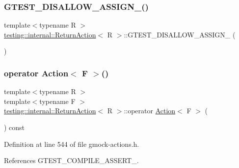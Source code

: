 \subsubsection{\texorpdfstring{G\+T\+E\+S\+T\+\_\+\+D\+I\+S\+A\+L\+L\+O\+W\+\_\+\+A\+S\+S\+I\+G\+N\+\_\+()}{GTEST\_DISALLOW\_ASSIGN\_()}}
{\footnotesize\ttfamily template$<$typename R $>$ \\
\hyperlink{classtesting_1_1internal_1_1ReturnAction}{testing\+::internal\+::\+Return\+Action}$<$ R $>$\+::G\+T\+E\+S\+T\+\_\+\+D\+I\+S\+A\+L\+L\+O\+W\+\_\+\+A\+S\+S\+I\+G\+N\+\_\+ (\begin{DoxyParamCaption}\item[{\hyperlink{classtesting_1_1internal_1_1ReturnAction}{Return\+Action}$<$ R $>$}]{ }\end{DoxyParamCaption})\hspace{0.3cm}{\ttfamily [private]}}

\mbox{\label{classtesting_1_1internal_1_1ReturnAction_a1aab69c4ea104e76e70ba209763f61d5}} 
\subsubsection{\texorpdfstring{operator Action$<$ F $>$()}{operator Action< F >()}}
{\footnotesize\ttfamily template$<$typename R $>$ \\
template$<$typename F $>$ \\
\hyperlink{classtesting_1_1internal_1_1ReturnAction}{testing\+::internal\+::\+Return\+Action}$<$ R $>$\+::operator \hyperlink{classtesting_1_1Action}{Action}$<$ F $>$ (\begin{DoxyParamCaption}{ }\end{DoxyParamCaption}) const\hspace{0.3cm}{\ttfamily [inline]}}



Definition at line 544 of file gmock-\/actions.\+h.



References G\+T\+E\+S\+T\+\_\+\+C\+O\+M\+P\+I\+L\+E\+\_\+\+A\+S\+S\+E\+R\+T\+\_\+.



